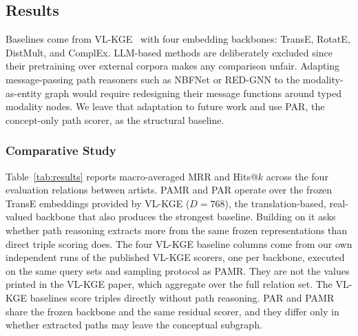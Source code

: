 \documentclass[runningheads]{llncs}
\begin{document}
\subsection{Results}
\label{sec:results}

Baselines come from VL-KGE~\cite{efthymiou2026vlkge} with four embedding
backbones: TransE, RotatE, DistMult, and ComplEx. LLM-based methods are
deliberately excluded since their pretraining over external corpora makes
any comparison unfair. Adapting message-passing path reasoners such as
NBFNet or RED-GNN to the modality-as-entity graph would require
redesigning their message functions around typed modality nodes. We leave
that adaptation to future work and use PAR, the concept-only path scorer,
as the structural baseline.

\subsubsection{Comparative Study}

Table~\ref{tab:results} reports macro-averaged MRR and Hits@$k$ across
the four evaluation relations between artists. PAMR and PAR operate over
the frozen TransE embeddings provided by VL-KGE ($D = 768$), the
translation-based, real-valued backbone that also produces the strongest
baseline. Building on it asks whether path reasoning extracts more from
the same frozen representations than direct triple scoring does. The four
VL-KGE baseline columns come from
our own independent runs of the published VL-KGE scorers, one per
backbone, executed on the same query sets and sampling protocol as PAMR.
They are not the values printed in the VL-KGE paper, which aggregate over
the full relation set. The VL-KGE baselines score triples directly
without path reasoning. PAR and PAMR share the frozen backbone and the
same residual scorer, and they differ only in whether extracted paths
may leave the conceptual subgraph.
\end{document}
